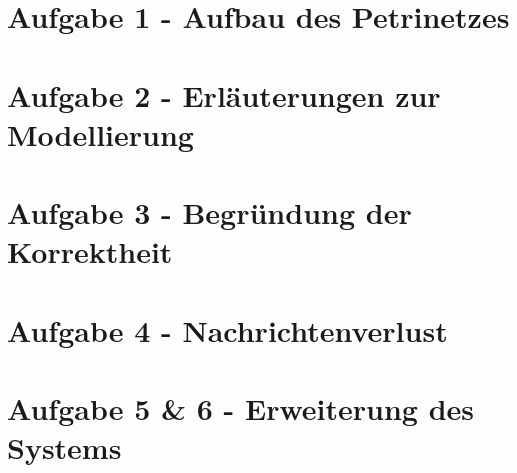 \documentclass[10pt]{scrartcl}
\author{Carsten Noetzel, Armin Steudte}
\title{\titletext}
\date{23.03.2012}
\begin{document}
\maketitle

\setcounter{tocdepth}{3}
\tableofcontents
\listoffigures

\section{Aufgabe 1 - Aufbau des Petrinetzes}


\section{Aufgabe 2 - Erläuterungen zur Modellierung}

\section{Aufgabe 3 - Begründung der Korrektheit}

\section{Aufgabe 4 - Nachrichtenverlust}

\section{Aufgabe 5 \& 6 - Erweiterung des Systems}
\end{document}
